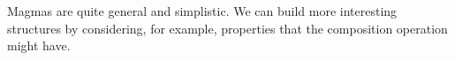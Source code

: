 Magmas are quite general and simplistic. We can build more interesting structures by considering, for example, properties that the composition operation might have.






\devel{}

\devel{}


